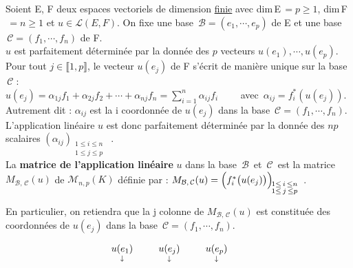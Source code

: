 Soient E, F deux espaces vectoriels de dimension \underline{finie} avec dim\,E\(\,=p\!\geq\! 1\), dim\,F\(\,=\!n\geq\!1\) et \(u\in \mathscr{L}(E,F)\). On fixe une base \(\, \mathcal{B}=(e_1,\cdots,e_p)\) de E et une base \(\, \mathcal{C}=(f_1,\cdots,f_n)\) de F.\vspace{0.2cm}\\
$u$ est parfaitement déterminée par la donnée des $p$ vecteurs \(u(e_1),\cdots, u(e_p).\)\\
Pour tout \(j\in \llbracket 1,p \rrbracket\), le vecteur \(u(e_j)\) de F s'écrit de manière unique sur la base \(\,\mathcal{C}\;\):\\
\(\displaystyle u(e_j)=\alpha_{1j}f_1+\alpha_{2j}f_2+\cdots+\alpha_{nj}f_n=\sum_{i=1}^{n}\alpha_{ij}f_i \qquad \) avec \(\,\alpha_{ij}=f_i^*(u(e_j))\).\\
Autrement dit : \(\alpha_{ij}\) est la i coordonnée de \(u(e_j)\) dans la base \(\,\mathcal{C}=(f_1,\cdots,f_n)\). L'application linéaire $u$ est donc parfaitement déterminée par la donnée des \(np\) scalaires \((\alpha_{ij})_{\substack{1\leq i\leq n \\ 1\leq j\leq p}}\)\ .\vspace{0.6cm}\\
La \textbf{matrice de l'application linéaire} $u$ dans la base \(\,\mathcal{B}\,\) et \(\,\mathcal{C}\,\) est la matrice \(M_{\mathcal{B},\,\mathcal{C}}(u)\) de \(\mathcal{M}_{n,p}(K)\) définie par : \(M_{\mathcal{B},\,\mathcal{C}}(u)=\Bigl(f_i^* \bigl( u(e_j) \bigr)\Bigr)_{\substack{\!1\leq \,i\,\leq n \\ \!1\leq \,j\,\leq p}}\)\ .\vspace{0.5cm}

En particulier, on retiendra que la j colonne de \(M_{\mathcal{B},\,\mathcal{C}}(u)\) est constituée des coordonnées de \(u(e_j)\) dans la base \(\, \mathcal{C}=(f_1,\cdots,f_n)\).\vspace{-0.1cm}

\[\hspace{-0.7cm} \arraycolsep=0.235cm \begin{array}{ccccc}
    \underset{\downarrow}{u(e_1)} & & \underset{\downarrow}{u(e_j)} & & \underset{\downarrow}{u(e_p)}
\end{array}\vspace{-0.4cm}\]

